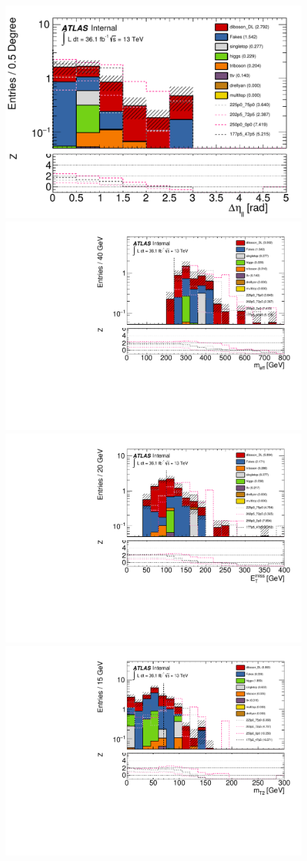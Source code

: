\begin{figure}[htpb]
\centering
\includegraphics[width=0.45\linewidth]{data/plot/SR_redefinition/SRjet23/leDeltaEtaLep_fakes.pdf}\includegraphics[width=0.45\linewidth]{data/plot/SR_redefinition/SRjet23/lemeff_fakes.pdf}\\
\includegraphics[width=0.45\linewidth]{data/plot/SR_redefinition/SRjet23/lemet_fakes.pdf}\includegraphics[width=0.45\linewidth]{data/plot/SR_redefinition/SRjet23/lemt2ll_fakes.pdf}\\

\end{figure}
